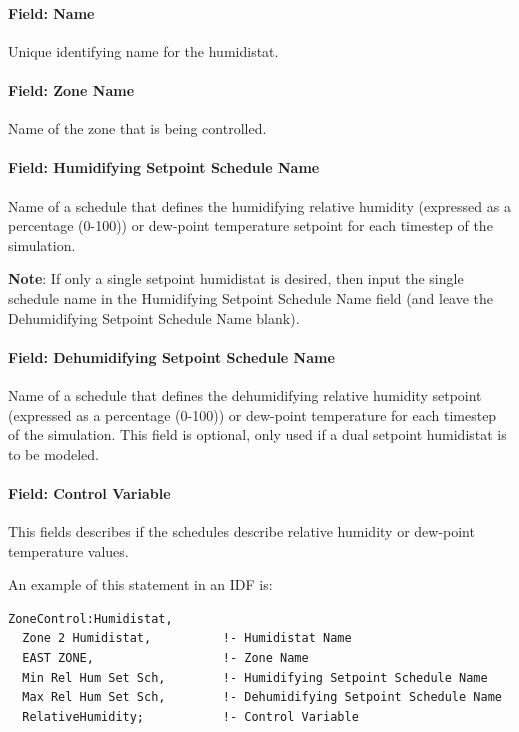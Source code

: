 \paragraph{Field: Name}\label{field-name-6-026}

Unique identifying name for the humidistat.

\paragraph{Field: Zone Name}\label{field-zone-name-014}

Name of the zone that is being controlled.

\paragraph{Field: Humidifying Setpoint Schedule Name}\label{field-humidifying-setpoint-schedule-name}

Name of a schedule that defines the humidifying relative humidity (expressed as a percentage (0-100)) or dew-point temperature setpoint for each timestep of the simulation.

\textbf{Note}: If only a single setpoint humidistat is desired, then input the single schedule name in the Humidifying Setpoint Schedule Name field (and leave the Dehumidifying Setpoint Schedule Name blank).

\paragraph{Field: Dehumidifying Setpoint Schedule Name}\label{field-dehumidifying-setpoint-schedule-name-1}

Name of a schedule that defines the dehumidifying relative humidity setpoint (expressed as a percentage (0-100)) or dew-point temperature for each timestep of the simulation. This field is optional, only used if a dual setpoint humidistat is to be modeled.

\paragraph{Field: Control Variable}\label{field-humidistat-control-variable}

This fields describes if the schedules describe relative humidity or dew-point temperature values.

An example of this statement in an IDF is:

\begin{lstlisting}
ZoneControl:Humidistat,
  Zone 2 Humidistat,          !- Humidistat Name
  EAST ZONE,                  !- Zone Name
  Min Rel Hum Set Sch,        !- Humidifying Setpoint Schedule Name
  Max Rel Hum Set Sch,        !- Dehumidifying Setpoint Schedule Name
  RelativeHumidity;           !- Control Variable
\end{lstlisting}

